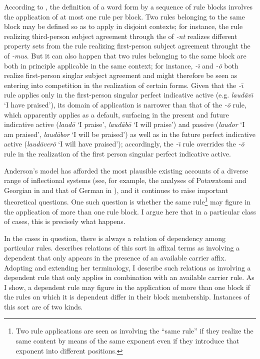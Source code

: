 \documentclass[output=paper,
modfonts
]{LSP/langsci}
\begin{document}
  According to , the definition of a word form by a sequence of rule blocks involves the application of at most one rule per block.  Two rules belonging to the same block may be defined so as to apply in disjoint contexts; for instance, the rule realizing third-person  subject agreement through the  of \textit{{}-nt} realizes different property sets from the rule realizing first-person  subject agreement throught the  of \textit{{}-mus}.  But it can also happen that two rules belonging to the same block are both in principle applicable in the same context; for instance, \textit{{}-\=\i} and \textit{{}-\=o} both realize first-person singlar subject agreement and might therefore be seen as entering into competition in the realization of certain forms.  Given that the \textit{{}-\=\i} rule\textit{} applies only in the first-person singular perfect indicative active (e.g.\textit{} \textit{laud\=av\=\i} ‘I have praised’), its domain of application is narrower than that of the \textit{{}-\=o} rule, which apparently applies as a default, surfacing in the present and future indicative active (\textit{laud\=o} ‘I praise’, \textit{laud\=ab\=o} ‘I will praise’) and passive (\textit{laudor} ‘I am praised’, \textit{laud\=abor} ‘I will be praised’) as well as in the future perfect indicative active (\textit{laud\=aver\=o} ‘I will have praised’); accordingly, the \textit{{}-\=\i} rule overrides the \textit{{}-\=o} rule in the realization of the first person singular perfect indicative active.

Anderson’s model has afforded the most plausible existing accounts of a diverse range of inflectional systems (see, for example, the analyses of Potawatomi and Georgian in \citealt{Anderson1977a,Anderson1984a,Anderson1986} and that of German in \citealt{Zwicky1985a}), and it continues to raise important theoretical questions. One such question is whether the same rule\footnote{Two rule applications are seen as involving the “same rule” if they realize the same  content by means of the same exponent even if they introduce that exponent into different positions.} may figure in the application of more than one rule block.  I argue here that in a particular class of cases, this is precisely what happens.  

In the cases in question, there is always a relation of dependency among particular rules.  \citet{Harris2017} describes relations of this sort in affixal terms as involving a dependent  that only appears in the presence of an available carrier affix.  Adopting and extending her terminology, I describe such relations as involving a dependent rule that only applies in combination with an available carrier rule.  As I show, a dependent rule may figure in the application of more than one block if the rules on which it is dependent differ in their block membership.  Instances of this sort are of two kinds.
\end{document}
